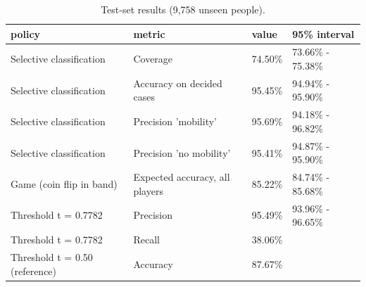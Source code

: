 \begin{table}
\caption{Test-set results (9,758 unseen people).}
\label{tab:results}
\begin{tabular}{llll}
\toprule
policy & metric & value & 95\% interval \\
\midrule
Selective classification & Coverage & 74.50\% & 73.66\% - 75.38\% \\
Selective classification & Accuracy on decided cases & 95.45\% & 94.94\% - 95.90\% \\
Selective classification & Precision 'mobility' & 95.69\% & 94.18\% - 96.82\% \\
Selective classification & Precision 'no mobility' & 95.41\% & 94.87\% - 95.90\% \\
Game (coin flip in band) & Expected accuracy, all players & 85.22\% & 84.74\% - 85.68\% \\
Threshold t = 0.7782 & Precision & 95.49\% & 93.96\% - 96.65\% \\
Threshold t = 0.7782 & Recall & 38.06\% &  \\
Threshold t = 0.50 (reference) & Accuracy & 87.67\% &  \\
\bottomrule
\end{tabular}
\end{table}
